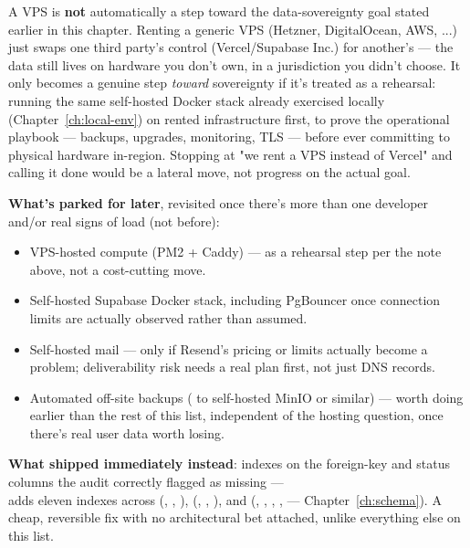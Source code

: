 \begin{olkwarn}
A VPS is \textbf{not} automatically a step toward the data-sovereignty goal stated earlier in this chapter. Renting a generic VPS (Hetzner, DigitalOcean, AWS, ...) just swaps one third party's control (Vercel/Supabase Inc.) for another's — the data still lives on hardware you don't own, in a jurisdiction you didn't choose. It only becomes a genuine step \emph{toward} sovereignty if it's treated as a rehearsal: running the same self-hosted Docker stack already exercised locally (Chapter~\ref{ch:local-env}) on rented infrastructure first, to prove the operational playbook — backups, upgrades, monitoring, TLS — before ever committing to physical hardware in-region. Stopping at "we rent a VPS instead of Vercel" and calling it done would be a lateral move, not progress on the actual goal.
\end{olkwarn}

\textbf{What's parked for later}, revisited once there's more than one developer and/or real signs of load (not before):
\begin{itemize}
  \item VPS-hosted compute (PM2 + Caddy) — as a rehearsal step per the note above, not a cost-cutting move.
  \item Self-hosted Supabase Docker stack, including PgBouncer once connection limits are actually observed rather than assumed.
  \item Self-hosted mail — only if Resend's pricing or limits actually become a problem; deliverability risk needs a real plan first, not just DNS records.
  \item Automated off-site backups ( to self-hosted MinIO or similar) — worth doing earlier than the rest of this list, independent of the hosting question, once there's real user data worth losing.
\end{itemize}

\textbf{What shipped immediately instead}: indexes on the foreign-key and status columns the audit correctly flagged as missing —\\  adds eleven  indexes across  (, , ),  (, , ), and  (, , , ,  — Chapter~\ref{ch:schema}). A cheap, reversible fix with no architectural bet attached, unlike everything else on this list.

